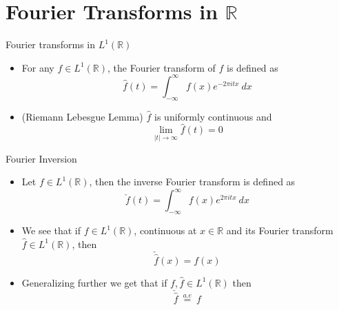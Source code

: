 \documentclass[compress]{beamer}
\newcommand{\R}{\mathbb R}
\begin{document}
\section{Fourier Transforms in $\R$}

\begin{frame}{Fourier transforms in $L^1(\R)$}
  \begin{itemize}
    \item For any $f\in L^1(\R)$, the Fourier transform of $f$ is defined as 
      \begin{equation}
        \hat{f}(t) = \int_{-\infty}^{\infty} f(x)e^{-2\pi i t x} \ dx
      \label{eq:Fourier_tranform}
      \end{equation}
      \pause
    \item (Riemann Lebesgue Lemma) $\hat{f}$ is uniformly continuous and 
      \begin{equation}
        \lim_{|t| \to \infty} \hat{f}(t) = 0
      \label{eq:Riemann_lebesgue_lemma}
      \end{equation}
  \end{itemize}
\end{frame}

\begin{frame}{Fourier Inversion}
  \begin{itemize}
    \item Let $f \in L^1(\R)$, then the inverse Fourier transform is defined as
      \begin{equation}
        \check{f}(t) = \int_{-\infty}^\infty f(x)e^{2\pi itx} \ dx
        \label{eq:Fourier_inversion}
      \end{equation}
      \pause
    \item We see that if $f \in L^1(\R)$, continuous at $x \in \R$ and its Fourier transform $\hat{f} \in L^1(\R)$, then
      \begin{equation}
        \check{\hat{f}}(x) = f(x)
        \label{eq:inversion_smh}
      \end{equation}
    \pause
    \item Generalizing further we get that if $f, \hat{f} \in L^1(\R)$ then 
      \begin{equation}
        \check{\hat{f}} \ \stackrel{a.e}{=} \ f
        \label{eq:inversion_a.e}
      \end{equation}
  \end{itemize}
\end{frame}
\end{document}
